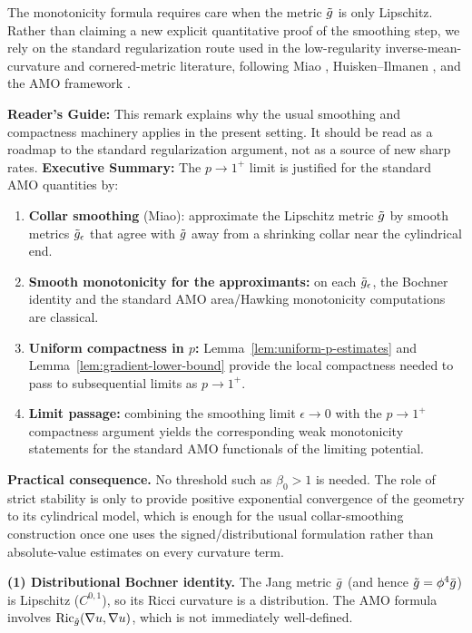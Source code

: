 \begin{remark}\label{rem:distributional-rigor}
The monotonicity formula requires care when the metric $\tilde{g}$ is only Lipschitz. Rather than claiming a new explicit quantitative proof of the smoothing step, we rely on the standard regularization route used in the low-regularity inverse-mean-curvature and cornered-metric literature, following Miao \cite{miao2002}, Huisken--Ilmanen \cite{huisken2001}, and the AMO framework \cite{amo2022}.

\textbf{Reader's Guide:} This remark explains why the usual smoothing and compactness machinery applies in the present setting. It should be read as a roadmap to the standard regularization argument, not as a source of new sharp rates.
\textbf{Executive Summary:} The $p \to 1^+$ limit is justified for the standard AMO quantities by:
\begin{enumerate}
    \item[(i)] \textbf{Collar smoothing} (Miao): approximate the Lipschitz metric $\tilde{g}$ by smooth metrics $\tilde{g}_\epsilon$ that agree with $\tilde{g}$ away from a shrinking collar near the cylindrical end.
    \item[(ii)] \textbf{Smooth monotonicity for the approximants:} on each $\tilde{g}_\epsilon$, the Bochner identity and the standard AMO area/Hawking monotonicity computations are classical.
    \item[(iii)] \textbf{Uniform compactness in $p$:} Lemma~\ref{lem:uniform-p-estimates} and Lemma~\ref{lem:gradient-lower-bound} provide the local compactness needed to pass to subsequential limits as $p \to 1^+$.
    \item[(iv)] \textbf{Limit passage:} combining the smoothing limit $\epsilon \to 0$ with the $p \to 1^+$ compactness argument yields the corresponding weak monotonicity statements for the standard AMO functionals of the limiting potential.
\end{enumerate}
\textbf{Practical consequence.} No threshold such as $\beta_0>1$ is needed. The role of strict stability is only to provide positive exponential convergence of the geometry to its cylindrical model, which is enough for the usual collar-smoothing construction once one uses the signed/distributional formulation rather than absolute-value estimates on every curvature term.

\textbf{(1) Distributional Bochner identity.} The Jang metric $\bar{g}$ (and hence $\tilde{g} = \phi^4\bar{g}$) is Lipschitz ($C^{0,1}$), so its Ricci curvature is a distribution. The AMO formula involves $\mathrm{Ric}_{\tilde{g}}(\nabla u, \nabla u)$, which is not immediately well-defined. 


\end{remark}

